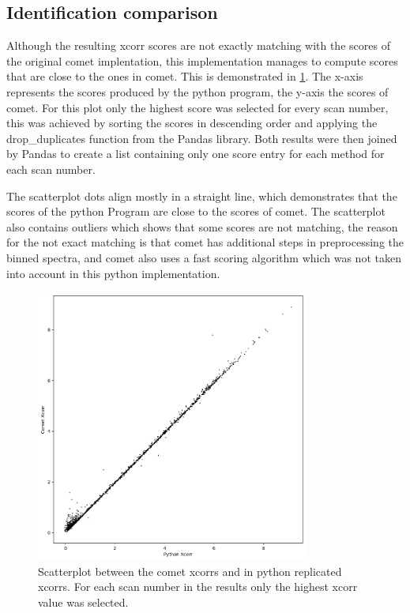 \documentclass[11pt]{article}
\begin{document}
\subsection{Identification comparison}
Although the resulting xcorr scores are not exactly matching with the scores of the original comet implentation, this implementation manages to compute scores that are close to the ones in comet. This is demonstrated in \cref{fig:scatterplot}. The x-axis represents the scores produced by the python program, the y-axis the scores of comet. For this plot only the highest score was selected for every scan number, this was achieved by sorting the scores in descending order and applying the drop\_duplicates function from the Pandas library. Both results were then joined by Pandas to create a list containing only one score entry for each method for each scan number. 

The scatterplot dots align mostly in a straight line, which demonstrates that the scores of the python Program are close to the scores of comet. The scatterplot also contains outliers which shows that some scores are not matching, the reason for the not exact matching is that comet has additional steps in preprocessing the binned spectra, and comet also uses a fast scoring algorithm which was not taken into account in this python implementation. 
\begin{figure}[ht]
\centering
\includegraphics[width=0.8\textwidth]{figs/scatterplot.png}
\caption{Scatterplot between the comet xcorrs and in python replicated xcorrs. For each scan number in the results only the highest xcorr value was selected.}
\label{fig:scatterplot}
\end{figure}
\end{document}
